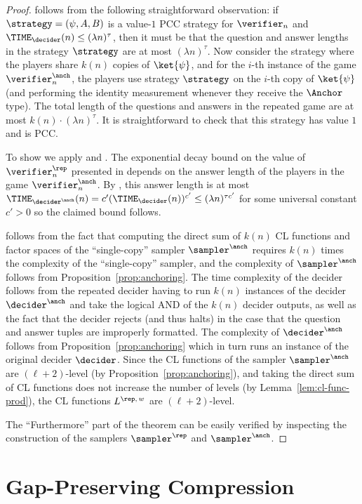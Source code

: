 \begin{proof}
	 follows from the following straightforward
  observation: if $\strategy = (\psi,A,B)$ is a value-$1$ PCC strategy for
  $\verifier_n$ and $\TIME_\decider(n) \leq (\lambda n)^\tau$, then it must be
  that the question and answer lengths in the strategy $\strategy$ are at most $(\lambda n)^\tau$. Now
  consider the strategy where the players share $k(n)$ copies of
  $\ket{\psi}$, and for the $i$-th instance of the game $\vanch_n$, the
  players use strategy $\strategy$ on the $i$-th copy of $\ket{\psi}$ (and
  performing the identity measurement whenever they receive the $\Anchor$ type). 
  The total length of the questions and answers in the repeated game are at most $k(n) \cdot (\lambda n)^\tau$. 
  It is straightforward to check that this strategy has value $1$ and is PCC.

	To show  we apply  and . 
  The exponential decay bound on the value of $\verifier^\rep_n$ presented
  in  depends on the answer length of the players in
  the game $\verifier_n^\anch$.
  By , this answer length is at most
  $\TIME_{\decider^\anch}(n) = c' (\TIME_\decider(n))^{c'} \leq (\lambda n)^{\tau c'}$ for some universal constant $c' > 0$ so the claimed bound follows.
	
	 follows from the fact that computing the direct sum
  of $k(n)$ CL functions and factor spaces of the ``single-copy'' sampler
  $\sanch$ requires $k(n)$ times the complexity of the ``single-copy''
  sampler, and the complexity of $\sanch$ follows from
  Proposition~\ref{prop:anchoring}.
	The time complexity of the decider follows from the repeated decider having to
  run $k(n)$ instances of the decider $\danch$ and take the logical AND
  of the $k(n)$ decider outputs, as well as the fact that the decider rejects (and thus halts) in the case that the question and answer tuples are improperly formatted. 
  The complexity of $\danch$ follows from
  Proposition~\ref{prop:anchoring} which in turn runs an instance of the
  original decider $\decider$.
  Since the CL functions of the sampler $\sanch$ are $(\ell+2)$-level
  (by Proposition~\ref{prop:anchoring}), and taking the direct sum of CL
  functions does not increase the number of levels (by
  Lemma~\ref{lem:cl-func-prod}), the CL functions $L^{\rep,\, w}$ are
  $(\ell+2)$-level.
  
  The ``Furthermore'' part of the theorem can be easily verified by inspecting the construction of the samplers $\sampler^\rep$ and $\sanch$. 
\end{proof}


 
\section{Gap-Preserving Compression}
